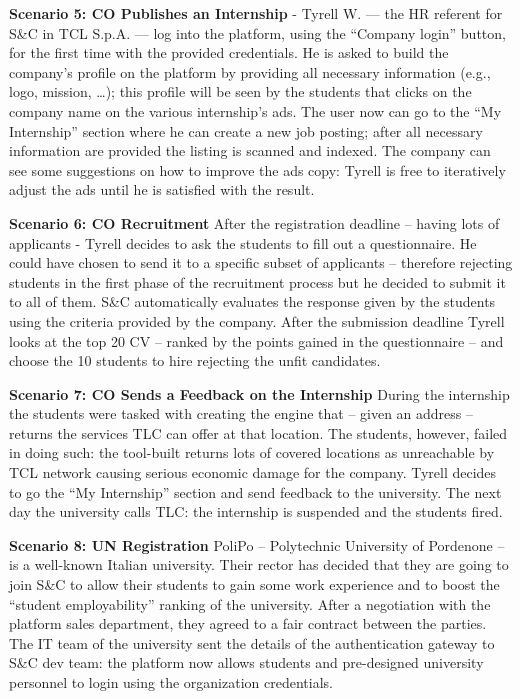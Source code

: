 \par{\textbf{Scenario 5: CO Publishes an Internship}} -	Tyrell W. — the HR referent for S\&C in TCL S.p.A. — log into
the platform, using the “Company login” button, for the first time with the provided credentials. He is asked to build
the company’s profile on the platform by providing all necessary information (e.g., logo, mission, …); this profile
will be seen by the students that clicks on the company name on the various internship’s ads. The user now can go to
the “My Internship” section where he can create a new job posting; after all necessary information are provided the
listing is scanned and indexed. The company can see some suggestions on how to improve the ads copy: Tyrell is free to
iteratively adjust the ads until he is satisfied with the result.

\par{\textbf{Scenario 6: CO Recruitment}} After the registration deadline – having lots of applicants - Tyrell decides to ask
the students to fill out a questionnaire. He could have chosen to send it to a specific subset of applicants –
therefore rejecting students in the first phase of the recruitment process but he decided to submit it to all of them.
S\&C automatically evaluates the response given by the students using the criteria provided by the company. After the
submission deadline Tyrell looks at the top 20 CV – ranked by the points gained in the questionnaire – and choose the
10 students to hire rejecting the unfit candidates.

\par{\textbf{Scenario 7: CO Sends a Feedback on the Internship}} During the internship the students were tasked with
creating the engine that – given an address – returns the services TLC can offer at that location. The students,
however, failed in doing such: the tool-built returns lots of covered locations as unreachable by TCL network causing
serious economic damage for the company. Tyrell decides to go the “My Internship” section and send feedback to the
university. The next day the university calls TLC: the internship is suspended and the students fired.

\par{\textbf{Scenario 8: UN Registration}} PoliPo – Polytechnic University of Pordenone – is a well-known Italian
university. Their rector has decided that they are going to join S\&C to allow their students to gain some work
experience and to boost the “student employability” ranking of the university. After a negotiation with the platform
sales department, they agreed to a fair contract between the parties. The IT team of the university sent the details of
the authentication gateway to S\&C dev team: the platform now allows students and pre-designed university personnel to
login using the organization credentials.

